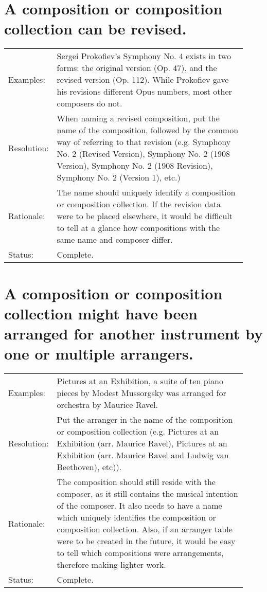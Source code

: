 \documentclass[letterpaper]{report}
\begin{document}
\section{A composition or composition collection can be revised.}
\label{D.5}

\begin{tabular}{ p{0.1\linewidth} p{0.825\linewidth} }
  Examples: & Sergei Prokofiev's Symphony No. 4 exists in two forms: the original version (Op. 47), and the revised version (Op. 112). While Prokofiev gave his revisions different Opus numbers, most other composers do not. \\ 
  Resolution: & When naming a revised composition, put the name of the composition, followed by the common way of referring to that revision (e.g. Symphony No. 2 (Revised Version), Symphony No. 2 (1908 Version), Symphony No. 2 (1908 Revision), Symphony No. 2 (Version 1), etc.)  \\
  Rationale: & The name should uniquely identify a composition or composition collection. If the revision data were to be placed elsewhere, it would be difficult to tell at a glance how compositions with the same name and composer differ. \\
  Status: & Complete. \\
\end{tabular}

\section{A composition or composition collection might have been arranged for another instrument by one or multiple arrangers.}
\label{D.5}

\begin{tabular}{ p{0.1\linewidth} p{0.825\linewidth} }
  Examples: & Pictures at an Exhibition, a suite of ten piano pieces by Modest Mussorgsky was arranged for orchestra by Maurice Ravel. \\ 
  Resolution: & Put the arranger in the name of the composition or composition collection (e.g. Pictures at an Exhibition (arr. Maurice Ravel), Pictures at an Exhibition (arr. Maurice Ravel and Ludwig van Beethoven), etc)).  \\
  Rationale: & The composition should still reside with the composer, as it still contains the musical intention of the composer. It also needs to have a name which uniquely identifies the composition or composition collection. Also, if an arranger table were to be created in the future, it would be easy to tell which compositions were arrangements, therefore making lighter work. \\
  Status: & Complete. \\
\end{tabular}
\end{document}
